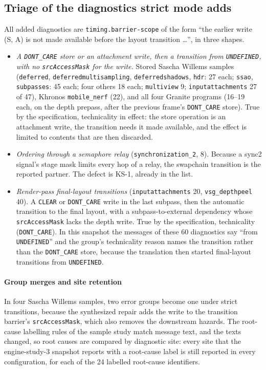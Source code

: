 \documentclass[acmtog,anonymous,review]{acmart}
\newcommand{\code}[1]{\texttt{#1}}
\begin{document}
\subsection{Triage of the diagnostics strict mode adds}
All added diagnostics are \code{timing.barrier-scope} of the form ``the earlier write (S, A) is not made available
before the layout transition \dots'', in three shapes.
\begin{itemize}
\item[(a)] \emph{A \code{DONT\_CARE} store or an attachment write, then a transition from \code{UNDEFINED}, with no
  \code{srcAccessMask} for the write.} Stored Sascha Willems samples (\code{deferred}, \code{deferredmultisampling},
  \code{deferredshadows}, \code{hdr}: 27 each; \code{ssao}, \code{subpasses}: 45 each; four others 18 each;
  \code{multiview} 9; \code{inputattachments} 27 of 47), Khronos \code{mobile\_nerf} (22), and all four Granite programs
  (16--19 each, on the depth prepass, after the previous frame's \code{DONT\_CARE} store). True by the specification,
  technicality in effect: the store operation is an attachment write, the transition needs it made available, and the
  effect is limited to contents that are then discarded.
\item[(b)] \emph{Ordering through a semaphore relay} (\code{synchronization\_2}, 8). Because a sync2 signal's stage
  mask limits every hop of a relay, the swapchain transition is the reported partner. The defect is KS-1, already in
  the list.
\item[(c)] \emph{Render-pass final-layout transitions} (\code{inputattachments} 20, \code{vsg\_depthpeel} 40). A
  \code{CLEAR} or \code{DONT\_CARE} write in the last subpass, then the automatic transition to the final layout, with a
  subpass-to-external dependency whose \code{srcAccessMask} lacks the depth write. True by the specification,
  technicality (\code{DONT\_CARE}). In this snapshot the messages of these 60 diagnostics say ``from
  \code{UNDEFINED}'' and the group's technicality reason names the transition rather than the \code{DONT\_CARE} store,
  because the translation then started final-layout transitions from \code{UNDEFINED}.
\end{itemize}

\paragraph{Group merges and site retention}
In four Sascha Willems samples, two error groups become one under strict transitions, because the synthesized repair
adds the write to the transition barrier's \code{srcAccessMask}, which also removes the downstream hazards. The
root-cause labelling rules of the sample study match message text, and the texts changed, so root causes are
compared by diagnostic site: every site that the engine-study-3 snapshot reports with a root-cause label is still
reported in every configuration, for each of the 24 labelled root-cause identifiers.
\end{document}
